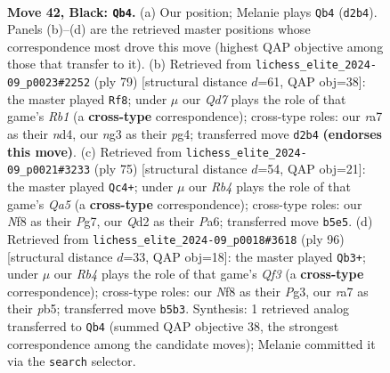 \documentclass[11pt]{article}
\begin{document}
\clearpage

\begin{figure}[p]\centering
\begin{subfigure}{0.46\textwidth}\centering
\resizebox{\linewidth}{!}{%
\newchessgame
\chessboard[
  setfen={5n1k/RpQ4p/7p/1r6/8/6NK/3q4/7R b - - 2 42},
  showmover=false,
  pgfstyle=straightmove, color=movearrow, markmove={d2-b4}
]}
\caption{}
\end{subfigure}\hfill
\begin{subfigure}{0.46\textwidth}\centering
\resizebox{\linewidth}{!}{%
\newchessgame
\chessboard[
  setfen={1r4k1/6p1/7p/8/3N2P1/2K1Rp1P/5r2/8 b - - 1 40},
  showmover=false,
  pgfstyle=straightmove, color=movearrow, markmove={b8-f8}
]}
\caption{}
\end{subfigure}
\\[4pt]
\begin{subfigure}{0.46\textwidth}\centering
\resizebox{\linewidth}{!}{%
\newchessgame
\chessboard[
  setfen={8/1p4pk/p3Q3/3p4/q7/3K4/1R3P2/7r b - - 5 38},
  showmover=false,
  pgfstyle=straightmove, color=movearrow, markmove={a4-c4}
]}
\caption{}
\end{subfigure}\hfill
\begin{subfigure}{0.46\textwidth}\centering
\resizebox{\linewidth}{!}{%
\newchessgame
\chessboard[
  setfen={4r3/2R5/3nk3/1p6/3q3P/5QP1/5P1K/8 w - - 11 49},
  showmover=false,
  pgfstyle=straightmove, color=movearrow, markmove={f3-b3}
]}
\caption{}
\end{subfigure}
\caption{\textbf{Move 42, Black: \texttt{Qb4}.} (a) Our position; Melanie plays \texttt{Qb4} (\texttt{d2b4}). Panels (b)--(d) are the retrieved master positions whose correspondence most drove this move (highest QAP objective among those that transfer to it). (b) Retrieved from \texttt{lichess\_elite\_2024-09\_p0023\#2252} (ply 79) [structural distance $d$=61, QAP obj=38]: the master played \texttt{Rf8}; under $\mu$ our \emph{Qd7} plays the role of that game's \emph{Rb1} (a \textbf{cross-type} correspondence); cross-type roles: our \emph{r}a7 as their \emph{n}d4, our \emph{n}g3 as their \emph{p}g4; transferred move \texttt{d2b4} \textbf{(endorses this move)}. (c) Retrieved from \texttt{lichess\_elite\_2024-09\_p0021\#3233} (ply 75) [structural distance $d$=54, QAP obj=21]: the master played \texttt{Qc4+}; under $\mu$ our \emph{Rb4} plays the role of that game's \emph{Qa5} (a \textbf{cross-type} correspondence); cross-type roles: our \emph{N}f8 as their \emph{P}g7, our \emph{Q}d2 as their \emph{P}a6; transferred move \texttt{b5e5}. (d) Retrieved from \texttt{lichess\_elite\_2024-09\_p0018\#3618} (ply 96) [structural distance $d$=33, QAP obj=18]: the master played \texttt{Qb3+}; under $\mu$ our \emph{Rb4} plays the role of that game's \emph{Qf3} (a \textbf{cross-type} correspondence); cross-type roles: our \emph{N}f8 as their \emph{P}g3, our \emph{r}a7 as their \emph{p}b5; transferred move \texttt{b5b3}. Synthesis: 1 retrieved analog transferred to \texttt{Qb4} (summed QAP objective 38, the strongest correspondence among the candidate moves); Melanie committed it via the \texttt{search} selector.}
\label{fig:thought-m83}
\end{figure}
\end{document}
